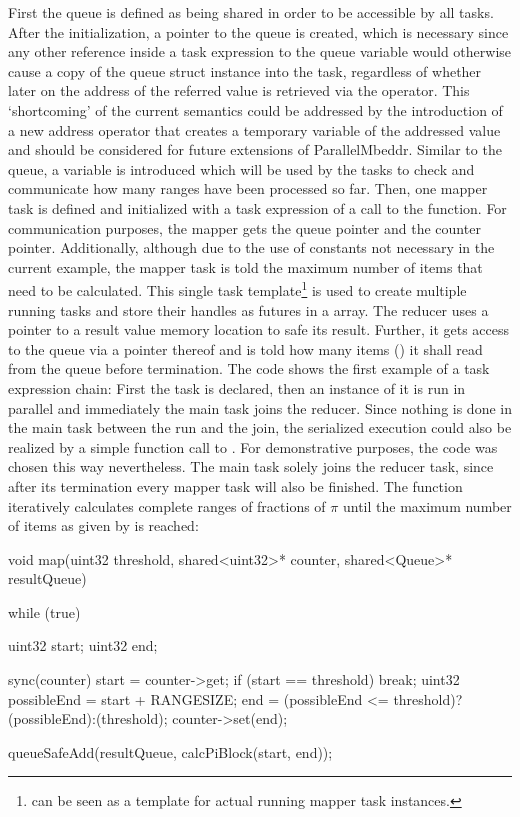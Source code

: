 First the queue is defined as being shared in order to be accessible by all tasks. After the initialization, a pointer to the queue is created, which is necessary since any other reference inside a task expression to the queue variable would otherwise cause a copy of the queue struct instance into the task, regardless of whether later on the address of the referred value is retrieved via the \CODE{\&} operator. This `shortcoming' of the current semantics could be addressed by the introduction of a new address operator that creates a temporary variable of the addressed value and should be considered for future extensions of ParallelMbeddr. Similar to the queue, a  variable is introduced which will be used by the tasks to check and communicate how many ranges have been processed so far. Then, one mapper task is defined and initialized with a task expression of a call to the  function. For communication purposes, the mapper gets the queue pointer and the counter pointer. Additionally, although due to the use of constants not necessary in the current example, the mapper task is told the maximum number of items that need to be calculated. This single task template\footnote{ can be seen as a template for actual running mapper task instances.} is used to create multiple running tasks and store their handles as futures in a  array. The reducer uses a pointer to a result value memory location to safe its result. Further, it gets access to the queue via a pointer thereof and is told how many items () it shall read from the queue before termination. The code shows the first example of a task expression chain: First the task is declared, then an instance of it is run in parallel and immediately the main task joins the reducer. Since nothing is done in the main task between the run and the join, the serialized execution could also be realized by a simple function call to . For demonstrative purposes, the code was chosen this way nevertheless. The main task solely joins the reducer task, since after its termination every mapper task will also be finished.
The  function iteratively calculates complete ranges of fractions of $\pi$ until the maximum number of items as given by  is reached:
\begin{ccode}
void map(uint32 threshold, shared<uint32>* counter, shared<Queue>* resultQueue) { 
  while (true) { 
    uint32 start; 
    uint32 end; 
     
    sync(counter) { 
      start = counter->get; 
      if (start == threshold) { 
        break; 
      } 
      uint32 possibleEnd = start + RANGESIZE; 
      end = (possibleEnd <= threshold)?(possibleEnd):(threshold); 
      counter->set(end); 
    } 
     
    queueSafeAdd(resultQueue, calcPiBlock(start, end)); 
  } 
}
\end{ccode}

